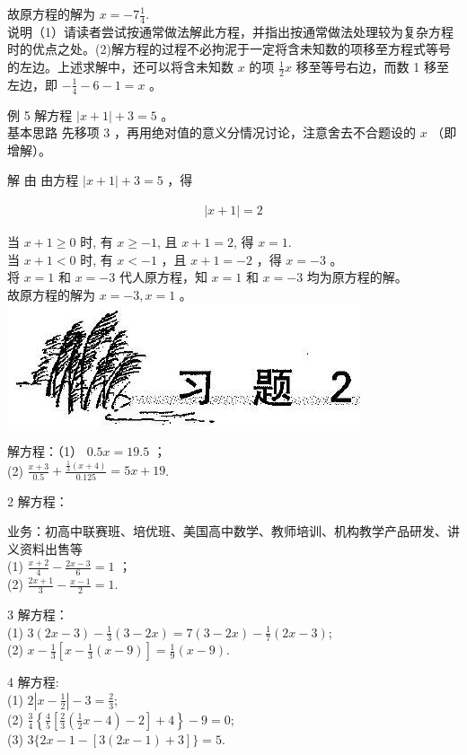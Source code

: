 \documentclass[10pt]{article}
\begin{document}
故原方程的解为 $x=-7 \frac{1}{4}$.\\
说明（1）请读者尝试按通常做法解此方程，并指出按通常做法处理较为复杂方程时的优点之处。(2)解方程的过程不必拘泥于一定将含未知数的项移至方程式等号的左边。上述求解中，还可以将含未知数 $x$ 的项 $\frac{1}{2} x$ 移至等号右边，而数 1 移至左边，即 $-\frac{1}{4}-6-1=x$ 。

例 5 解方程 $|x+1|+3=5$ 。\\
基本思路 先移项 3 ，再用绝对值的意义分情况讨论，注意舍去不合题设的 $x$ （即增解）。

解 由 由方程 $|x+1|+3=5$ ，得

\begin{align*}
|x+1|=2
\end{align*}

当 $x+1 \geqslant 0$ 时, 有 $x \geqslant-1$, 且 $x+1=2$, 得 $x=1$.\\
当 $x+1<0$ 时, 有 $x<-1$ ，且 $x+1=-2$ ，得 $x=-3$ 。\\
将 $x=1$ 和 $x=-3$ 代人原方程，知 $x=1$ 和 $x=-3$ 均为原方程的解。\\
故原方程的解为 $x=-3, x=1$ 。\\
\includegraphics[max width=\textwidth, center]{2024_10_30_26b590fd1106d28139f0g-012}

解方程：（1） $0.5 x=19.5$ ；\\
(2) $\frac{x+3}{0.5}+\frac{\frac{1}{3}(x+4)}{0.125}=5 x+19$.

2 解方程：

业务：初高中联赛班、培优班、美国高中数学、教师培训、机构教学产品研发、讲义资料出售等\\
(1) $\frac{x+2}{4}-\frac{2 x-3}{6}=1$ ；\\
(2) $\frac{2 x+1}{3}-\frac{x-1}{2}=1$.

3 解方程：\\
(1) $3(2 x-3)-\frac{1}{3}(3-2 x)=7(3-2 x)-\frac{1}{7}(2 x-3)$;\\
(2) $x-\frac{1}{3}\left[x-\frac{1}{3}(x-9)\right]=\frac{1}{9}(x-9)$.

4 解方程:\\
(1) $2\left|x-\frac{1}{2}\right|-3=\frac{2}{3}$;\\
(2) $\frac{3}{4}\left\{\frac{4}{5}\left[\frac{2}{3}\left(\frac{1}{2} x-4\right)-2\right]+4\right\}-9=0$;\\
(3) $3\{2 x-1-[3(2 x-1)+3]\}=5$.
\end{document}
